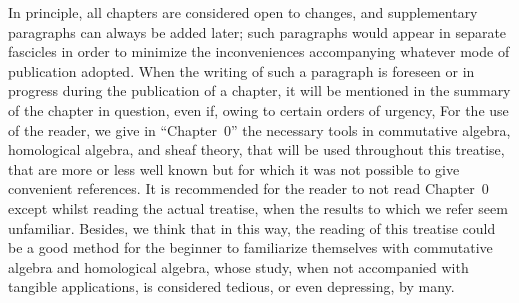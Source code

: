 \bigskip

In principle, all chapters are considered open to changes, and supplementary
paragraphs can always be added later; such paragraphs would appear in separate
fascicles in order to minimize the inconveniences accompanying whatever mode of
publication adopted. When the writing of such a paragraph is foreseen or in
progress during the publication of a chapter, it will be mentioned in the
summary of the chapter in question, even if, owing to certain orders of urgency,
 For the use of
the reader, we give in ``Chapter~0'' the necessary tools in commutative algebra,
homological algebra, and sheaf theory, that will be used throughout this
treatise, that are more or less well known but for which it was not possible to
give convenient references. It is recommended for the reader to not read
Chapter~0 except whilst reading the actual treatise, when the results to which
we refer
seem unfamiliar. Besides, we think that in this way, the
reading of this treatise could be a good method for the beginner to familiarize
themselves with commutative algebra and homological algebra, whose study, when
not accompanied with tangible applications, is considered tedious, or even
depressing, by many.

\sectionbreak

